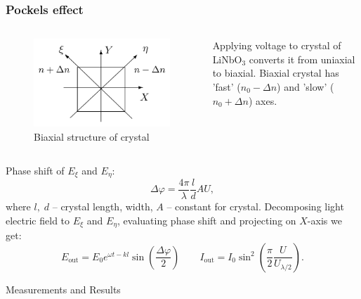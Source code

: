 \documentclass{beamer}
\begin{document}
	\begin{frame}
		\frametitle{Pockels effect}
		
		\begin{columns}
			\begin{column}{0.5\linewidth}
				\begin{figure}
					\centering
					\includegraphics[width=\linewidth]{res/pockels.png}
					\caption{Biaxial structure of crystal}
				\end{figure}
				
			\end{column}
			\begin{column}{0.5\linewidth}
				Applying voltage to crystal of LiNbO$_3$ converts it from uniaxial to biaxial.
				Biaxial crystal has 'fast' ($n_0 - \Delta n$) and 'slow' ($n_0 + \Delta n$) axes.
				
			\end{column}
		\end{columns}
		\footnotesize
		Phase shift of $E_{\xi}$ and $E_{\eta}$:
		$$ \Delta \varphi = \frac{4\pi}{\lambda} \frac{l}{d} AU,$$
		where $l, \; d$ -- crystal length, width, $A$ -- constant for crystal.
		Decomposing light electric field to $E_{\xi}$ and $E_{\eta}$, evaluating phase shift and projecting on $X$-axis we get:
		$$ E_{\text{out}} = E_0 e^{\omega t - k l} \sin\left(\frac{\Delta \varphi}{2}\right) \qquad I_{\text{out}} = I_0 \sin^2\left(\frac{\pi}{2}\frac{U}{U_{\lambda/2}}\right).$$
	\end{frame}
		
	\begin{frame}[plain,c]	
		\begin{center}
			\huge {} Measurements and Results
		\end{center}
	\end{frame}	
	
\end{document}
